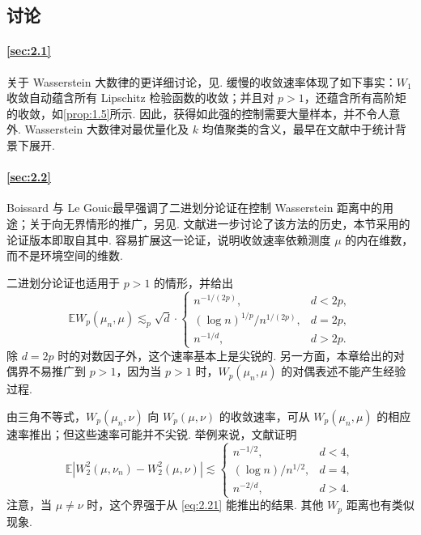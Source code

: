 \subsection{讨论}\label{sec:2.9}
\paragraph{\autoref{sec:2.1}}
关于 Wasserstein 大数律的更详细讨论，见\cite[第11章]{ref123}. 缓慢的收敛速率体现了如下事实：$W_1$ 收敛自动蕴含所有 Lipschitz 检验函数的收敛；并且对 $p>1$，还蕴含所有高阶矩的收敛，如\autoref{prop:1.5}所示. 因此，获得如此强的控制需要大量样本，并不令人意外. Wasserstein 大数律对最优量化及 $k$ 均值聚类的含义，最早在文献\cite{ref259}中于统计背景下展开.

\paragraph{\autoref{sec:2.2}}
Boissard 与 Le Gouic\cite{ref45}最早强调了二进划分论证在控制 Wasserstein 距离中的用途；关于向无界情形的推广，另见\cite{ref108,ref136}. 文献\cite{ref239}进一步讨论了该方法的历史，本节采用的论证版本即取自其中. 容易扩展这一论证，说明收敛速率依赖测度 $\mu$ 的内在维数，而不是环境空间的维数.

二进划分论证也适用于 $p>1$ 的情形，并给出
\begin{equation}\label{eq:2.21}
\mathbb EW_p(\mu_n,\mu)\lesssim_p\sqrt d\cdot\begin{cases}
n^{-1/(2p)},&d<2p,\\
(\log n)^{1/p}/n^{1/(2p)},&d=2p,\\
n^{-1/d},&d>2p.
\end{cases}
\end{equation}
除 $d=2p$ 时的对数因子外，这个速率基本上是尖锐的. 另一方面，本章给出的对偶界不易推广到 $p>1$，因为当 $p>1$ 时，$W_p(\mu_n,\mu)$ 的对偶表述不能产生经验过程.

由三角不等式，$W_p(\mu_n,\nu)$ 向 $W_p(\mu,\nu)$ 的收敛速率，可从 $W_p(\mu_n,\mu)$ 的相应速率推出；但这些速率可能并不尖锐. 举例来说，文献\cite{ref85}证明
\begin{equation}\label{eq:2.22}
\mathbb E|W_2^2(\mu,\nu_n)-W_2^2(\mu,\nu)|\lesssim\begin{cases}
n^{-1/2},&d<4,\\
(\log n)/n^{1/2},&d=4,\\
n^{-2/d},&d>4.
\end{cases}
\end{equation}
注意，当 $\mu\ne\nu$ 时，这个界强于从 \eqref{eq:2.21} 能推出的结果. 其他 $W_p$ 距离也有类似现象\cite{ref220}.

